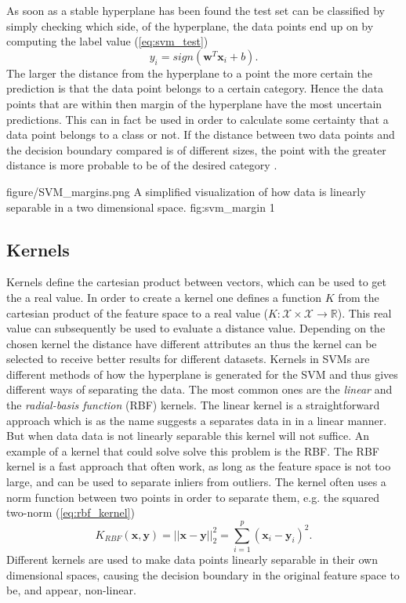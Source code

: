 As soon as a stable hyperplane has been found the test set can be classified by simply checking which side, of the hyperplane, the data points end up on by computing the label value (\ref{eq:svm_test})
\begin{equation}
\label{eq:svm_test}
y_i = sign\left(\mathbf{w}^T\mathbf{x}_i+b\right).
\end{equation}
The larger the distance from the hyperplane to a point the more certain the prediction is that the data point belongs to a certain category. Hence the data points that are within then margin of the hyperplane have the most uncertain predictions. This can in fact be used in order to calculate some certainty that a data point belongs to a class or not. If the distance between two data points and the decision boundary compared is of different sizes, the point with the greater distance is more probable to be of the desired category \cite{tong2001support}. 


\singlefigure
{figure/SVM_margins.png}
{A simplified visualization of how data is linearly separable in a two dimensional space.}
{fig:svm_margin}
{1}


\subsection{Kernels}

Kernels define the cartesian product between vectors, which can be used to get the a real value. In order to create a kernel one defines a function $K$ from the cartesian product of the feature space to a real value ($K:\mathcal{X}\times \mathcal{X} \rightarrow \mathbb{R}$). This real value can subsequently be used to evaluate a distance value. Depending on the chosen kernel the distance have different attributes an thus the kernel can be selected to receive better results for different datasets.
Kernels in SVMs are different methods of how the hyperplane is generated for the SVM and thus gives different ways of separating the data.  The most common ones are the \emph{linear} and the \emph{radial-basis function} (RBF) kernels. The linear kernel is a straightforward approach which is as the name suggests a separates data in in a linear manner. 
But when data data is not linearly separable this kernel will not suffice. 
An example of a kernel that could solve solve this problem is the RBF. The RBF kernel is a fast approach that often work, as long as the feature space is not too large, and can be used to separate inliers from outliers. The kernel often uses a norm function between two points in order to separate them, e.g. the squared two-norm  (\ref{eq:rbf_kernel})
\begin{equation}
\label{eq:rbf_kernel}
K_{RBF}(\textbf{x},\textbf{y}) = ||\textbf{x}-\textbf{y}||_2 ^2=\sum_{i=1}^p  (\textbf{x}_i-\textbf{y}_i)^2.
\end{equation}
Different kernels are used to make data points linearly separable in their own dimensional spaces, causing the decision boundary in the original feature space to be, and appear, non-linear.
